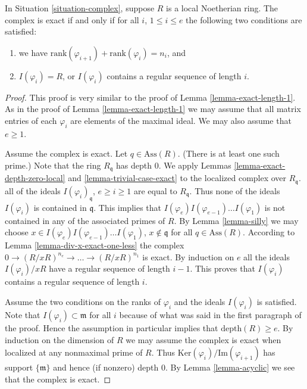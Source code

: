 \begin{proposition}
\label{proposition-what-exact}
In Situation \ref{situation-complex}, suppose $R$ is
a local Noetherian ring. The complex is exact if and
only if for all $i$, $1 \leq i \leq e$
the following two conditions are satisfied:
\begin{enumerate}
\item we have $\text{rank}(\varphi_{i+1}) + \text{rank}(\varphi_i)
= n_i$, and
\item $I(\varphi_i) = R$, or $I(\varphi_i)$ contains a
regular sequence of length $i$.
\end{enumerate}
\end{proposition}

\begin{proof}
This proof is very similar to the proof of Lemma
\ref{lemma-exact-length-1}.
As in the proof of Lemma \ref{lemma-exact-length-1} we may assume
that all matrix entries of each $\varphi_i$ are elements of
the maximal ideal. We may also assume that $e \geq 1$.

\medskip\noindent
Assume the complex is exact. Let $q \in \text{Ass}(R)$.
(There is at least one such prime.)
Note that the ring $R_{\mathfrak q}$ has depth $0$.
We apply Lemmas \ref{lemma-exact-depth-zero-local} and
\ref{lemma-trivial-case-exact} to the localized complex
over $R_{\mathfrak q}$. all of the ideals
$I(\varphi_i)_{\mathfrak q}$, $e \geq i \geq 1$
are equal to $R_{\mathfrak q}$. Thus none of the ideals
$I(\varphi_i)$ is contained in $\mathfrak q$.
This implies that $I(\varphi_e)I(\varphi_{e-1})\ldots I(\varphi_1)$
is not contained in any of the associated primes 
of $R$. By Lemma \ref{lemma-silly} we may choose
$x \in I(\varphi_e)I(\varphi_{e-1})\ldots I(\varphi_1)$,
$x \not \in \mathfrak q$ for all $q\in \text{Ass}(R)$.
According to Lemma \ref{lemma-div-x-exact-one-less}
the complex $0 \to (R/xR)^{n_e}
\to \ldots \to (R/xR)^{n_1}$ is exact. By induction
on $e$ all the ideals $I(\varphi_i)/xR$ have a regular
sequence of length $i-1$. This proves that $I(\varphi_i)$
contains a regular sequence of length $i$.

\medskip\noindent
Assume the two conditions on the ranks of $\varphi_i$
and the ideals $I(\varphi_i)$ is satisfied. Note that
$I(\varphi_i) \subset \mathfrak m$ for all $i$ because
of what was said in the first paragraph of the proof.
Hence the assumption in particular implies that
$\text{depth}(R) \geq e$. By induction
on the dimension of $R$ we may assume the complex
is exact when localized at any nonmaximal prime of $R$.
Thus $\text{Ker}(\varphi_i)/\text{Im}(\varphi_{i+1})$
has support $\{\mathfrak m\}$ and hence (if nonzero)
depth $0$. By Lemma \ref{lemma-acyclic} we see
that the complex is exact.
\end{proof}












